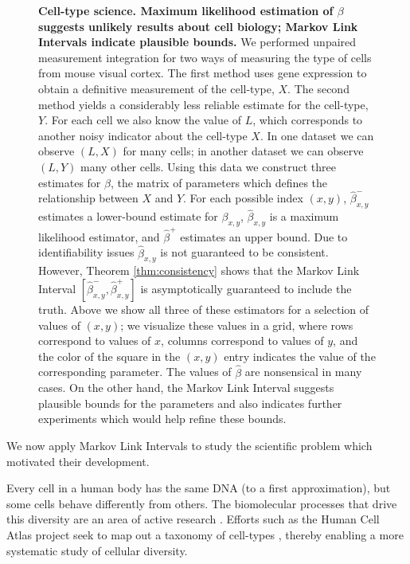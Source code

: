 \documentclass{article}
\theoremstyle{definition}
\begin{document}
\begin{figure}
{\begin{minipage}{\textwidth}
\hfill{}\begin{minipage}{.9\textwidth}
\caption{\textbf{Cell-type science.  Maximum likelihood estimation of $\beta$ suggests unlikely results about cell biology; Markov Link Intervals indicate plausible bounds.}  \label{fig:allen}
%
We performed unpaired measurement integration for two ways of measuring the type of cells from mouse visual cortex.  The first method uses gene expression to obtain a definitive measurement of the cell-type, $X$.  The second method yields a considerably less reliable estimate for the cell-type, $Y$.  For each cell we also know the value of $L$, which corresponds to another noisy indicator about the cell-type $X$.  In one dataset we can observe $(L,X)$ for many cells; in another dataset we can observe $(L,Y)$ many other cells.  Using this data we construct three estimates for $\beta$, the matrix of parameters which defines the relationship between $X$ and $Y$.  For each possible index $(x,y)$, $\hat \beta^{-}_{x,y}$ estimates a lower-bound estimate for $\beta_{x,y}$, $\hat \beta_{x,y}$ is a maximum likelihood estimator, and $\hat \beta^{+}$ estimates an upper bound.  Due to identifiability issues $\hat \beta_{x,y}$ is not guaranteed to be consistent.  However, Theorem \ref{thm:consistency} shows that the Markov Link Interval $[\hat \beta^{-}_{x,y},\hat \beta^{+}_{x,y}]$ is asymptotically guaranteed to include the truth.  Above we show all three of these estimators for a selection of values of $(x,y)$; we visualize these values in a grid, where rows correspond to values of $x$, columns correspond to values of $y$, and the color of the square in the $(x,y)$ entry indicates the value of the corresponding parameter.  The values of $\hat \beta$ are nonsensical in many cases.  On the other hand, the Markov Link Interval suggests plausible bounds for the parameters and also indicates further experiments which would help refine these bounds.
}
\end{minipage}\hfill{}
\end{minipage}}\end{figure}

We now apply Markov Link Intervals to study the scientific problem which motivated their development.  

Every cell in a human body has the same DNA (to a first approximation), but some cells behave differently from others.  The biomolecular processes that drive this diversity are an area of active research \cite{wagner2018single,boudreau2018cell,he2018mechanical}.  Efforts such as the Human Cell Atlas project seek to map out a taxonomy of cell-types \cite{rozenblatt2017human}, thereby enabling a more systematic study of cellular diversity.  
\end{document}
